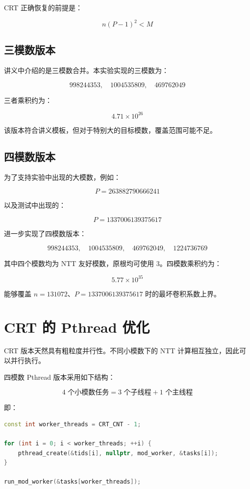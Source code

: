 \documentclass[UTF8,a4paper,12pt]{ctexart}
\begin{document}
CRT 正确恢复的前提是：

\[
n(P-1)^2 < M
\]

\subsection{三模数版本}

讲义中介绍的是三模数合并。本实验实现的三模数为：

\[
998244353,\quad 1004535809,\quad 469762049
\]

三者乘积约为：

\[
4.71\times 10^{26}
\]

该版本符合讲义模板，但对于特别大的目标模数，覆盖范围可能不足。

\subsection{四模数版本}

为了支持实验中出现的大模数，例如：

\[
P=263882790666241
\]

以及测试中出现的：

\[
P=1337006139375617
\]

进一步实现了四模数版本：

\[
998244353,\quad 1004535809,\quad 469762049,\quad 1224736769
\]

其中四个模数均为 NTT 友好模数，原根均可使用 3。四模数乘积约为：

\[
5.77\times 10^{35}
\]

能够覆盖 $n=131072$、$P=1337006139375617$ 时的最坏卷积系数上界。

\section{CRT 的 Pthread 优化}

CRT 版本天然具有粗粒度并行性。不同小模数下的 NTT 计算相互独立，因此可以并行执行。

四模数 Pthread 版本采用如下结构：

\[
4\text{ 个小模数任务}
=3\text{ 个子线程}+1\text{ 个主线程}
\]

即：

\begin{lstlisting}[language=C++]
const int worker_threads = CRT_CNT - 1;

for (int i = 0; i < worker_threads; ++i) {
    pthread_create(&tids[i], nullptr, mod_worker, &tasks[i]);
}

run_mod_worker(&tasks[worker_threads]);
\end{lstlisting}
\end{document}
